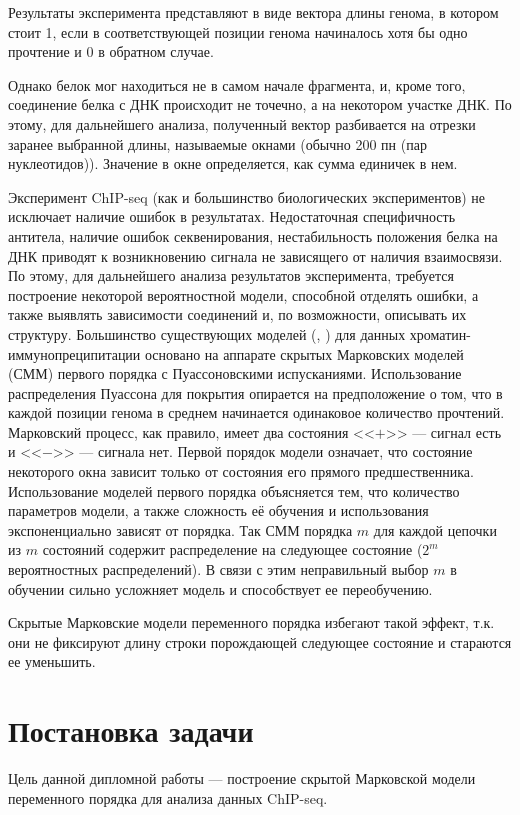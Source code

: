 \documentclass{matmex-diploma-custom}
\begin{document}
Результаты эксперимента представляют в виде вектора длины генома, в котором
стоит 1, если в соответствующей позиции генома начиналось хотя бы одно прочтение
и 0 в обратном случае.

Однако белок мог находиться не в самом начале фрагмента, и, кроме того, соединение белка с ДНК происходит не точечно, а на некотором участке ДНК.
По этому, для дальнейшего анализа, полученный вектор разбивается на отрезки заранее выбранной длины, называемые окнами (обычно 200 пн (пар нуклеотидов)). Значение в окне определяется, как сумма единичек в нем. 

Эксперимент ChIP-seq (как и большинство биологических
экспериментов) не исключает наличие ошибок в результатах. Недостаточная специфичность антитела, наличие ошибок секвенирования, нестабильность положения белка на ДНК приводят к возникновению сигнала не
зависящего от наличия взаимосвязи.
По этому, для дальнейшего анализа результатов эксперимента, требуется построение некоторой вероятностной модели, способной отделять ошибки, а также 
выявлять зависимости соединений и, по возможности, описывать их структуру.
Большинство существующих моделей (\cite{Zhang2008}, \cite{Spyrou2009}) для данных
хроматин-иммунопреципитации основано на аппарате скрытых Марковских моделей (СММ) \cite{Rabiner1989}
первого порядка с Пуассоновскими испусканиями. Использование распределения
Пуассона для покрытия опирается на предположение о том, что в каждой
позиции генома в среднем начинается одинаковое количество прочтений.
Марковский процесс, как правило, имеет два состояния <<$+$>> --- сигнал есть и <<$-$>> --- сигнала нет. Первой порядок модели означает, что состояние некоторого окна зависит только от состояния его прямого предшественника.
Использование моделей первого порядка объясняется тем, что количество параметров
модели, а также сложность её обучения и использования экспоненциально зависят от
порядка. Так СММ порядка $ m $ для каждой цепочки из $ m $ состояний содержит распределение на следующее состояние ($ 2^m $ вероятностных распределений). В связи с этим неправильный выбор $ m $ в обучении сильно усложняет модель и способствует ее переобучению. 

Скрытые Марковские модели переменного порядка избегают такой эффект, т.к. они не фиксируют длину строки порождающей следующее состояние и стараются ее уменьшить.

\section{Постановка задачи}
Цель данной дипломной работы --- построение скрытой Марковской модели переменного
порядка для анализа данных ChIP-seq.
\end{document}
